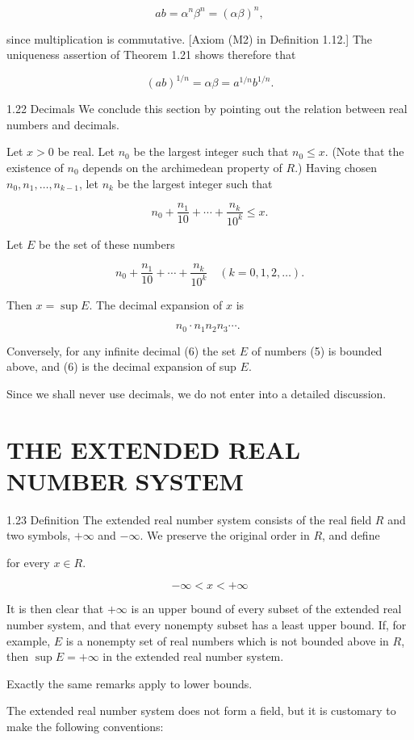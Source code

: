 \documentclass[10pt]{article}
\begin{document}
$$
a b=\alpha^{n} \beta^{n}=(\alpha \beta)^{n},
$$

since multiplication is commutative. [Axiom (M2) in Definition 1.12.] The uniqueness assertion of Theorem 1.21 shows therefore that

$$
(a b)^{1 / n}=\alpha \beta=a^{1 / n} b^{1 / n} .
$$

1.22 Decimals We conclude this section by pointing out the relation between real numbers and decimals.

Let $x>0$ be real. Let $n_{0}$ be the largest integer such that $n_{0} \leq x$. (Note that the existence of $n_{0}$ depends on the archimedean property of $R$.) Having chosen $n_{0}, n_{1}, \ldots, n_{k-1}$, let $n_{k}$ be the largest integer such that

$$
n_{0}+\frac{n_{1}}{10}+\cdots+\frac{n_{k}}{10^{k}} \leq x .
$$

Let $E$ be the set of these numbers

$$
n_{0}+\frac{n_{1}}{10}+\cdots+\frac{n_{k}}{10^{k}} \quad(k=0,1,2, \ldots) .
$$

Then $x=\sup E$. The decimal expansion of $x$ is

$$
n_{0} \cdot n_{1} n_{2} n_{3} \cdots \text {. }
$$

Conversely, for any infinite decimal (6) the set $E$ of numbers (5) is bounded above, and (6) is the decimal expansion of sup $E$.

Since we shall never use decimals, we do not enter into a detailed discussion.

\section{THE EXTENDED REAL NUMBER SYSTEM}
1.23 Definition The extended real number system consists of the real field $R$ and two symbols, $+\infty$ and $-\infty$. We preserve the original order in $R$, and define

for every $x \in R$.

$$
-\infty<x<+\infty
$$

It is then clear that $+\infty$ is an upper bound of every subset of the extended real number system, and that every nonempty subset has a least upper bound. If, for example, $E$ is a nonempty set of real numbers which is not bounded above in $R$, then $\sup E=+\infty$ in the extended real number system.

Exactly the same remarks apply to lower bounds.

The extended real number system does not form a field, but it is customary to make the following conventions:
\end{document}
